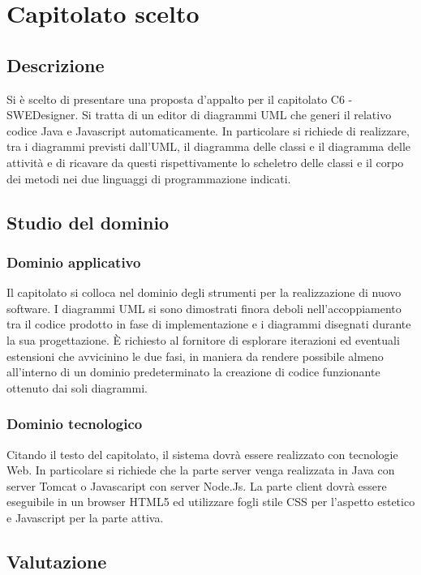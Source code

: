 \documentclass[../StudioDiFattibilita.tex]{subfiles}
\begin{document}
	\section{Capitolato scelto}
		\subsection{Descrizione}
		Si è scelto di presentare una proposta d'appalto per il capitolato C6 - SWEDesigner.
		Si tratta di un editor di diagrammi UML che generi il relativo codice Java e Javascript automaticamente.
		In particolare si richiede di realizzare, tra i diagrammi previsti dall'UML, il diagramma delle classi e il diagramma delle attività 
		e di ricavare da questi rispettivamente lo scheletro delle classi e il corpo dei metodi nei due linguaggi di programmazione
		indicati.
		\subsection{Studio del dominio}
			\subsubsection{Dominio applicativo}
			Il capitolato si colloca nel dominio degli strumenti per la realizzazione di nuovo software.
			I diagrammi UML si sono dimostrati finora deboli nell'accoppiamento tra il codice prodotto in fase di implementazione e 
			i diagrammi disegnati durante la sua progettazione. È richiesto al fornitore di esplorare iterazioni ed eventuali 
			estensioni che avvicinino le due fasi, in maniera da rendere possibile almeno all'interno di un dominio predeterminato
			la creazione di codice funzionante ottenuto dai soli diagrammi.
			\subsubsection{Dominio tecnologico}
			Citando il testo del capitolato, il sistema dovrà essere realizzato con tecnologie Web.
			In particolare si richiede che la parte server venga realizzata in Java con server Tomcat o Javascaript con server
			Node.Js. La parte client dovrà essere eseguibile in un browser HTML5 ed utilizzare fogli stile CSS per l’aspetto 
			estetico e Javascript per la parte attiva.
		\subsection{Valutazione}
\end{document}
